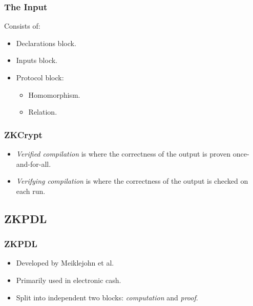 \documentclass{beamer}
\begin{document}
\begin{frame}
	\frametitle{The Input}
	Consists of:
	\begin{itemize}
		\item Declarations block.
		
		\item Inputs block.
		
		\item Protocol block:
		\begin{itemize}
			\item Homomorphism.
			\item Relation.
		\end{itemize}
	\end{itemize}
\end{frame}

\begin{frame}
	\frametitle{ZKCrypt}
	\begin{itemize}
		\item \textit{Verified compilation} is where the correctness of the output is proven once-and-for-all.
		\item \textit{Verifying compilation} is where the correctness of the output is checked on each run.
	\end{itemize}
\end{frame}

\subsection{ZKPDL}

\begin{frame}
	\frametitle{ZKPDL}
	\begin{itemize}
		\item Developed by Meiklejohn et al.
		
		\item Primarily used in electronic cash.
		
		\item Split into independent two blocks: \textit{computation} and \textit{proof}.
		
	\end{itemize}
\end{frame}
\end{document}
